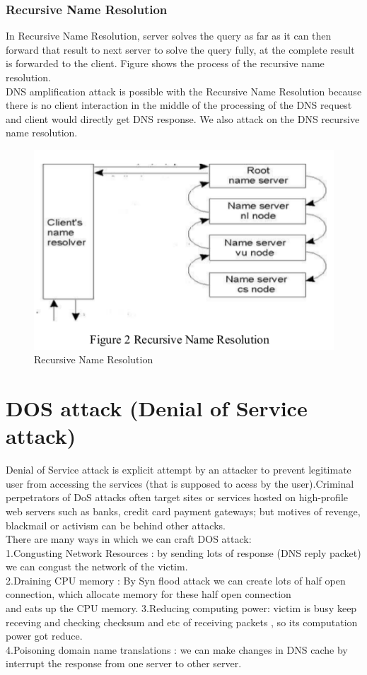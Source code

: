 \documentclass[11pt]{article}
\begin{document}
\subsubsection{Recursive Name Resolution}
In Recursive Name Resolution, server solves the query as far as it can then forward that result to next server to solve the query fully, at the complete result is forwarded to the client. Figure shows the process of the recursive name resolution. \\
DNS amplification attack is possible with the Recursive Name Resolution because there is no client interaction in the middle of the processing of the DNS request and client would directly get DNS response. We also attack on the DNS recursive name resolution.
\begin{figure}[h]
\includegraphics[scale=0.6]{rec.png}
\caption{Recursive Name Resolution}
\end{figure}

\section{DOS attack (Denial of Service attack)}
Denial of Service attack is explicit attempt by an attacker to prevent legitimate user from accessing the services (that is supposed to acess by the user).Criminal perpetrators of DoS attacks often target sites or services hosted on high-profile web servers such as banks, credit card payment gateways; but motives of revenge, blackmail or activism can be behind other attacks.\\
There are many ways in which we can craft DOS attack:\\
1.Congusting Network Resources : by sending lots of response (DNS reply packet) we can congust the network of the victim.\\
2.Draining CPU memory : By Syn flood attack we can create lots of half open connection, which allocate memory for these half open connection\\ and eats up the CPU memory.
3.Reducing computing power: victim is busy keep receving and checking checksum and etc of receiving packets , so its computation power got reduce.\\
4.Poisoning domain name translations : we can make changes in DNS cache by interrupt the response from one server to other server.\\
\end{document}
